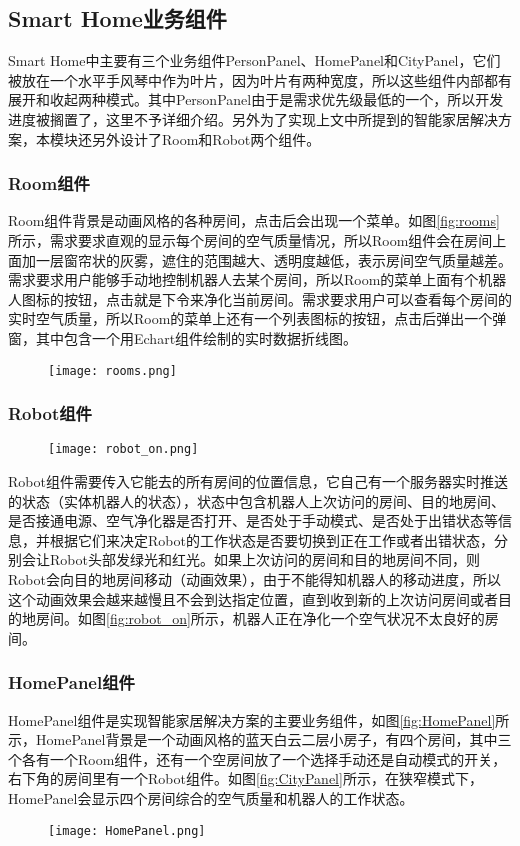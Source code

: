 \subsection{Smart Home业务组件}
Smart Home中主要有三个业务组件PersonPanel、HomePanel和CityPanel，它们被放在一个水平手风琴中作为叶片，因为叶片有两种宽度，所以这些组件内部都有展开和收起两种模式。其中PersonPanel由于是需求优先级最低的一个，所以开发进度被搁置了，这里不予详细介绍。另外为了实现上文中所提到的智能家居解决方案，本模块还另外设计了Room和Robot两个组件。
\subsubsection{Room组件}
Room组件背景是动画风格的各种房间，点击后会出现一个菜单。如图\ref{fig:rooms}所示，需求要求直观的显示每个房间的空气质量情况，所以Room组件会在房间上面加一层窗帘状的灰雾，遮住的范围越大、透明度越低，表示房间空气质量越差。需求要求用户能够手动地控制机器人去某个房间，所以Room的菜单上面有个机器人图标的按钮，点击就是下令来净化当前房间。需求要求用户可以查看每个房间的实时空气质量，所以Room的菜单上还有一个列表图标的按钮，点击后弹出一个弹窗，其中包含一个用Echart组件绘制的实时数据折线图。
\begin{figure}[!htp]
 \centering
 \texttt{[image: rooms.png]}
\end{figure}
\subsubsection{Robot组件}
\begin{figure}[!htp]
 \centering
 \texttt{[image: robot\_on.png]}
\end{figure}
Robot组件需要传入它能去的所有房间的位置信息，它自己有一个服务器实时推送的状态（实体机器人的状态），状态中包含机器人上次访问的房间、目的地房间、是否接通电源、空气净化器是否打开、是否处于手动模式、是否处于出错状态等信息，并根据它们来决定Robot的工作状态是否要切换到正在工作或者出错状态，分别会让Robot头部发绿光和红光。如果上次访问的房间和目的地房间不同，则Robot会向目的地房间移动（动画效果），由于不能得知机器人的移动进度，所以这个动画效果会越来越慢且不会到达指定位置，直到收到新的上次访问房间或者目的地房间。如图\ref{fig:robot_on}所示，机器人正在净化一个空气状况不太良好的房间。
\subsubsection{HomePanel组件}
HomePanel组件是实现智能家居解决方案的主要业务组件，如图\ref{fig:HomePanel}所示，HomePanel背景是一个动画风格的蓝天白云二层小房子，有四个房间，其中三个各有一个Room组件，还有一个空房间放了一个选择手动还是自动模式的开关，右下角的房间里有一个Robot组件。如图\ref{fig:CityPanel}所示，在狭窄模式下，HomePanel会显示四个房间综合的空气质量和机器人的工作状态。
\begin{figure}[!htp]
 \centering
 \texttt{[image: HomePanel.png]}
\end{figure}

